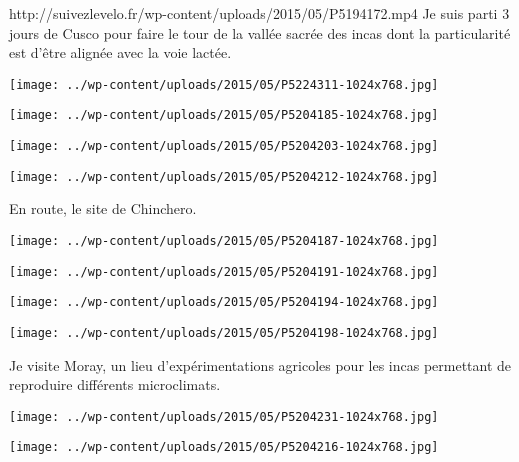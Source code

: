   \newline
 http://suivezlevelo.fr/wp-content/uploads/2015/05/P5194172.mp4 \newline
 Je suis parti 3 jours de Cusco pour faire le tour de la vallée sacrée des incas dont la particularité est d'être alignée avec la voie lactée. \newline
 \newline
\centerline{\texttt{[image: ../wp-content/uploads/2015/05/P5224311-1024x768.jpg]} } 
 \newline
 \newline
\centerline{\texttt{[image: ../wp-content/uploads/2015/05/P5204185-1024x768.jpg]} } 
 \newline
 \newline
\centerline{\texttt{[image: ../wp-content/uploads/2015/05/P5204203-1024x768.jpg]} } 
 \newline
 \newline
\centerline{\texttt{[image: ../wp-content/uploads/2015/05/P5204212-1024x768.jpg]} } 
 \newline
 En route, le site de Chinchero. \newline
 \newline
\centerline{\texttt{[image: ../wp-content/uploads/2015/05/P5204187-1024x768.jpg]} } 
 \newline
 \newline
\centerline{\texttt{[image: ../wp-content/uploads/2015/05/P5204191-1024x768.jpg]} } 
 \newline
 \newline
\centerline{\texttt{[image: ../wp-content/uploads/2015/05/P5204194-1024x768.jpg]} } 
 \newline
 \newline
\centerline{\texttt{[image: ../wp-content/uploads/2015/05/P5204198-1024x768.jpg]} } 
 \newline
 Je visite Moray, un lieu d'expérimentations agricoles pour les incas permettant de reproduire différents microclimats. \newline
 \newline
\centerline{\texttt{[image: ../wp-content/uploads/2015/05/P5204231-1024x768.jpg]} } 
 \newline
 \newline
\centerline{\texttt{[image: ../wp-content/uploads/2015/05/P5204216-1024x768.jpg]} } 
 \newline
 \newline
